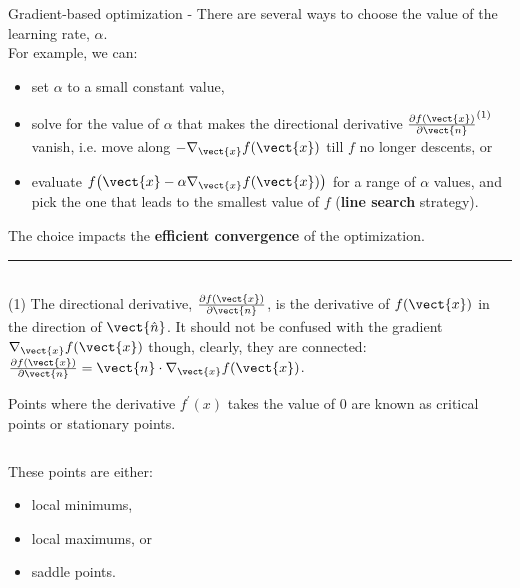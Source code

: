 \begin{frame}[t,allowframebreaks]{Gradient-based optimization -}
    There are several ways to choose the value of 
    the \gls{learning rate}, $\alpha$.\\
    \vspace{0.2cm}
    For example, we can:
    \begin{itemize}
        \item 
          set $\alpha$ to a small constant value,
        \item 
          solve for the value of $\alpha$ that makes the 
          directional derivative $\frac{\partial f(\vect{x})}{\partial \vect{n}}^{(1)}$ 
          vanish, i.e. move along $-\nabla_{\vect{x}} f(\vect{x})$
          till $f$ no longer descents, or
        \item 
          evaluate $f\big(\vect{x} - \alpha \nabla_{\vect{x}} f(\vect{x})\big)$
          for a range of $\alpha$ values, and  pick the one that leads to the smallest
          value of $f$ ({\bf line search} strategy).
    \end{itemize}
    \vspace{0.2cm}
    The choice impacts the {\bf efficient convergence} of the optimization.\\
    \noindent\rule{4cm}{0.4pt}\\
    \vspace{0.1cm}
    {\tiny
    (1) The directional derivative, 
    $\frac{\partial f(\vect{x})}{\partial \vect{n}}$,
    is the derivative of $f(\vect{x})$ in the direction of $\vect{\hat{n}}$. 
    It should not be confused with the gradient 
    $\nabla_{\vect{x}} f(\vect{x})$ though,
    clearly, they are connected: 
    $\frac{\partial f(\vect{x})}{\partial \vect{n}} = 
     \vect{n} \cdot \nabla_{\vect{x}} f(\vect{x})$.\\
    }


    \framebreak


    Points where the 
    \gls{derivative} $f^\prime(x)$ 
    takes the value of 0  are known as 
    \glspl{critical point} or 
    \glspl{stationary point}.\\

    \vspace{0.2cm}

    \begin{columns}
        \begin{column}{0.32\textwidth}
            These points are either: 
            \begin{itemize}
              \item {}\glspl{local minimum}, 
              \item {}\glspl{local maximum}, or
              \item {}\glspl{saddle point}.\\        
            \end{itemize}
            \end{column}
        \begin{column}{0.68\textwidth}


\end{column}
\end{columns}
\end{frame}
